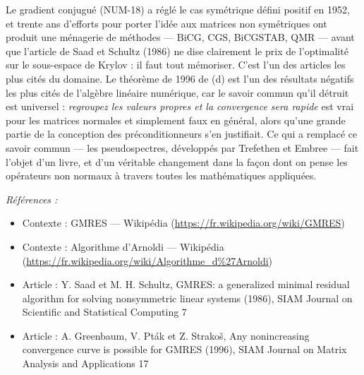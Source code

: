 \documentclass[11pt]{article}
\newenvironment{refs}{\par\small\noindent\emph{Références :}\begin{itemize}\setlength\itemsep{0pt}}{\end{itemize}\normalsize}
\begin{document}
\noindent Le gradient conjugué (NUM-18) a réglé le cas symétrique défini positif en 1952, et trente ans d'efforts pour porter l'idée aux matrices non symétriques ont produit une ménagerie de méthodes --- BiCG, CGS, BiCGSTAB, QMR --- avant que l'article de Saad et Schultz (1986) ne dise clairement le prix de l'optimalité sur le sous-espace de Krylov : il faut tout mémoriser. C'est l'un des articles les plus cités du domaine. Le théorème de 1996 de (d) est l'un des résultats négatifs les plus cités de l'algèbre linéaire numérique, car le savoir commun qu'il détruit est universel : \textit{regroupez les valeurs propres et la convergence sera rapide} est vrai pour les matrices normales et simplement faux en général, alors qu'une grande partie de la conception des préconditionneurs s'en justifiait. Ce qui a remplacé ce savoir commun --- les pseudospectres, développés par Trefethen et Embree --- fait l'objet d'un livre, et d'un véritable changement dans la façon dont on pense les opérateurs non normaux à travers toutes les mathématiques appliquées.

\begin{refs}
\item Contexte : GMRES --- Wikipédia (\url{https://fr.wikipedia.org/wiki/GMRES})
\item Contexte : Algorithme d'Arnoldi --- Wikipédia (\url{https://fr.wikipedia.org/wiki/Algorithme_d%27Arnoldi})
\item Article : Y. Saad et M. H. Schultz, \og{} GMRES: a generalized minimal residual algorithm for solving nonsymmetric linear systems \fg{} (1986), SIAM Journal on Scientific and Statistical Computing 7
\item Article : A. Greenbaum, V. Pták et Z. Strako\v{s}, \og{} Any nonincreasing convergence curve is possible for GMRES \fg{} (1996), SIAM Journal on Matrix Analysis and Applications 17
\end{refs}

\bigskip
\end{document}
